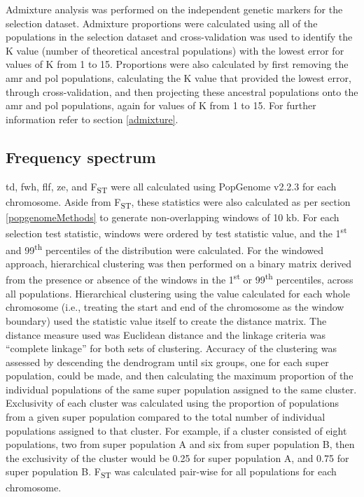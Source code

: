 \documentclass[]{report}
\begin{document}
Admixture analysis was performed on the independent genetic markers for
the selection dataset. Admixture proportions were calculated using all
of the populations in the selection dataset and cross-validation was
used to identify the K value (number of theoretical ancestral
populations) with the lowest error for values of K from 1 to 15.
Proportions were also calculated by first removing the \gls{amr} and
\gls{pol} populations, calculating the K value that provided the lowest
error, through cross-validation, and then projecting these ancestral
populations onto the \gls{amr} and \gls{pol} populations, again for
values of K from 1 to 15. For further information refer to section
\ref{admixture}.

\subsection{Frequency spectrum}\label{frequency-spectrum}

\Gls{td}, \gls{fwh}, \gls{flf}, \gls{ze}, and F\textsubscript{ST} were
all calculated using PopGenome v2.2.3 \citep{Pfeifer2014} for each
chromosome. Aside from F\textsubscript{ST}, these statistics were also
calculated as per section \ref{popgenomeMethods} to generate
non-overlapping windows of 10 kb. For each selection test statistic,
windows were ordered by test statistic value, and the
1\textsuperscript{st} and 99\textsuperscript{th} percentiles of the
distribution were calculated. For the windowed approach, hierarchical
clustering was then performed on a binary matrix derived from the
presence or absence of the windows in the 1\textsuperscript{st} or
99\textsuperscript{th} percentiles, across all populations. Hierarchical
clustering using the value calculated for each whole chromosome (i.e.,
treating the start and end of the chromosome as the window boundary)
used the statistic value itself to create the distance matrix. The
distance measure used was Euclidean distance and the linkage criteria
was ``complete linkage'' for both sets of clustering. Accuracy of the
clustering was assessed by descending the dendrogram until six groups,
one for each super population, could be made, and then calculating the
maximum proportion of the individual populations of the same super
population assigned to the same cluster. Exclusivity of each cluster was
calculated using the proportion of populations from a given super
population compared to the total number of individual populations
assigned to that cluster. For example, if a cluster consisted of eight
populations, two from super population A and six from super population
B, then the exclusivity of the cluster would be 0.25 for super
population A, and 0.75 for super population B. F\textsubscript{ST} was
calculated pair-wise for all populations for each chromosome.
\end{document}
